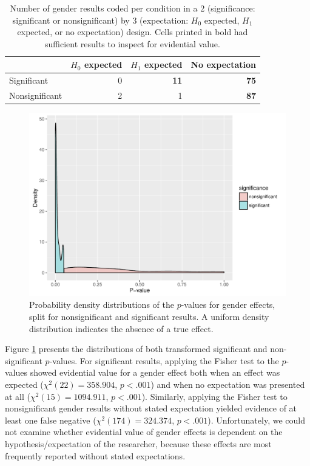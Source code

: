 \documentclass{article}
\begin{document}
\begin{table}[htbp]
\caption{Number of gender results coded per condition in a 2 (significance: significant or nonsignificant) by 3 (expectation: $H_0$ expected, $H_1$ expected, or no expectation) design. Cells printed in bold had sufficient results to inspect for evidential value.}
\centering
\begin{tabular}{lrrr}
& $H_0$ expected & $H_1$ expected & No expectation \\
\hline
Significant    & 0           & \textbf{11}          & \textbf{75}             \\
Nonsignificant & 2           & 1           & \textbf{87}     \\
\hline
\end{tabular}
\label{tab:tab5}
\end{table}

\begin{figure}
\begin{center}
\includegraphics{../figures/Fig6.pdf}
\end{center}
\caption{Probability density distributions of the $p$-values for gender effects, split for nonsignificant and significant results. A uniform density distribution indicates the absence of a true effect.}
\label{fig:fig6}
\end{figure}

Figure \ref{fig:fig6} presents the distributions of both transformed significant and non-significant $p$-values. For significant results, applying the Fisher test to the $p$-values showed evidential value for a gender effect both when an effect was expected ($\chi^2(22)=358.904$, $p<.001$) and when no expectation was presented at all ($\chi^2(15)=1094.911$, $p<.001$). Similarly, applying the Fisher test to nonsignificant gender results without stated expectation yielded evidence of at least one false negative ($\chi^2(174)=324.374$, $p<.001$). Unfortunately, we could not examine whether evidential value of gender effects is dependent on the hypothesis/expectation of the researcher, because these effects are most frequently reported without stated expectations. 
\end{document}
